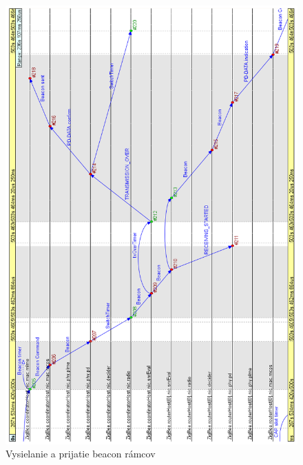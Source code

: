 {\begin{figure}[htbp]
\begin{center}
\includegraphics[width=140mm]{figures/chart_beacon}
\caption{Vysielanie a prijatie beacon rámcov}
\label{fig:chart_beacon}
\end{center}
\end{figure}
\begin{figure}[htbp]
\begin{center}

\end{center}
\end{figure}}
